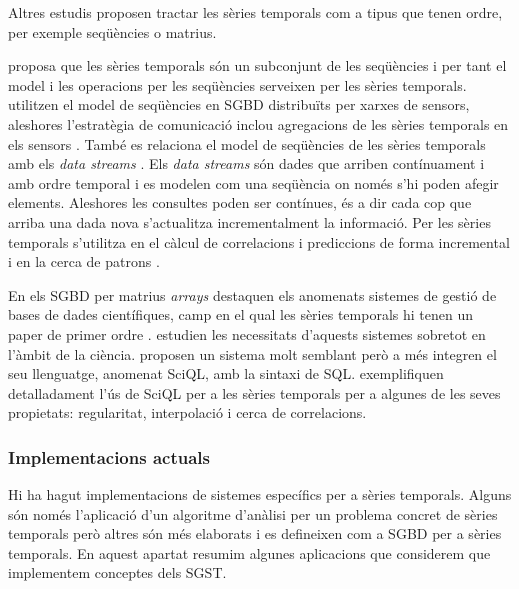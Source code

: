 Altres estudis proposen tractar les sèries temporals com a tipus que tenen ordre, per exemple seqüències o matrius.

\textcite{seshadri96:thesis} proposa que les sèries temporals són un subconjunt de les seqüències i per tant el model i les operacions per les seqüències \parencite{seshadri95} serveixen per les sèries temporals. 
\textcite{bonnet01} utilitzen el model de seqüències en SGBD distribuïts per xarxes de sensors, aleshores l'estratègia de comunicació inclou agregacions de les sèries temporals en els sensors \parencite{demers03}.
També es relaciona el model de seqüències de les sèries temporals amb els \emph{data streams} \parencite{babcock02,jagadish95}. Els \emph{data streams} són dades que arriben contínuament i amb ordre temporal i es modelen com una seqüència on només s'hi poden afegir elements. Aleshores les consultes poden ser contínues, és a dir cada cop que arriba una dada nova s'actualitza incrementalment la informació. Per les sèries temporals s'utilitza en el càlcul de correlacions i prediccions de forma incremental \parencite{yi00} i en la cerca de patrons \parencite{bai05}.

En els SGBD per matrius \emph{arrays} destaquen els anomenats sistemes de gestió de bases de dades científiques, camp en el qual les sèries temporals hi tenen un paper de primer ordre \parencite{zhang11}. \textcite{stonebraker09:scidb} estudien les necessitats d'aquests sistemes sobretot en l'àmbit de la ciència. \textcite{kersten11} proposen un sistema molt semblant però a més integren el seu llenguatge, anomenat SciQL, amb la sintaxi de SQL. \textcite{zhang11} exemplifiquen detalladament l'ús de SciQL per a les sèries temporals per a algunes de les seves propietats: regularitat, interpolació i cerca de correlacions.



\subsubsection{Implementacions actuals}

Hi ha hagut implementacions de sistemes específics per a sèries temporals. Alguns són només l'aplicació d'un algoritme d'anàlisi per un problema concret de sèries temporals però  altres  són més elaborats i es defineixen com a SGBD per a sèries temporals. 
En aquest apartat resumim algunes aplicacions que considerem que implementem conceptes dels SGST.


